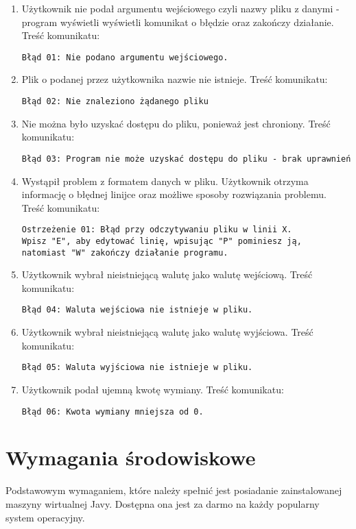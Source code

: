 \documentclass{article}
\begin{document}
\begin{enumerate}
\item Użytkownik nie podał argumentu wejściowego czyli nazwy pliku z danymi - program wyświetli wyświetli komunikat o błędzie oraz zakończy działanie. Treść komunikatu: \begin{verbatim}Błąd 01: Nie podano argumentu wejściowego.\end{verbatim}
\item Plik o podanej przez użytkownika nazwie nie istnieje. Treść komunikatu: \begin{verbatim}Błąd 02: Nie znaleziono żądanego pliku\end{verbatim}
\item Nie można było uzyskać dostępu do pliku, ponieważ jest chroniony. Treść komunikatu: \begin{verbatim}Błąd 03: Program nie może uzyskać dostępu do pliku - brak uprawnień\end{verbatim}
\item Wystąpił problem z formatem danych w pliku. Użytkownik otrzyma informację o błędnej linijce oraz możliwe sposoby rozwiązania problemu. Treść komunikatu:\begin{verbatim}Ostrzeżenie 01: Błąd przy odczytywaniu pliku w linii X.
Wpisz "E", aby edytować linię, wpisując "P" pominiesz ją,
natomiast "W" zakończy działanie programu. \end{verbatim}
\item Użytkownik wybrał nieistniejącą walutę jako walutę wejściową. Treść komunikatu:\begin{verbatim}Błąd 04: Waluta wejściowa nie istnieje w pliku.\end{verbatim}
\item Użytkownik wybrał nieistniejącą walutę jako walutę wyjściowa. Treść komunikatu:\begin{verbatim}Błąd 05: Waluta wyjściowa nie istnieje w pliku.\end{verbatim}
\item Użytkownik podał ujemną kwotę wymiany. Treść komunikatu:\begin{verbatim}Błąd 06: Kwota wymiany mniejsza od 0.\end{verbatim}
\end{enumerate}

\section{Wymagania środowiskowe}
Podstawowym wymaganiem, które należy spełnić jest posiadanie zainstalowanej maszyny wirtualnej Javy. Dostępna ona jest za darmo na każdy popularny system operacyjny.
\end{document}
